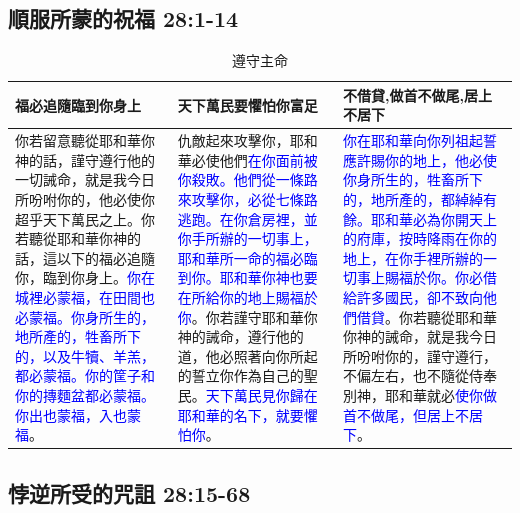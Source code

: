 \subsection{順服所蒙的祝福 28:1-14 }
\begin{table}[H]
\begin{center}

\begin{tabular}{ p{5.2cm}|p{5.4cm}|p{5.8cm} } \toprule
福必追隨臨到你身上&天下萬民要懼怕你富足&不借貸,做首不做尾,居上不居下\\\hline
你若留意聽從耶和華你神的話，謹守遵行他的一切誡命，就是我今日所吩咐你的，他必使你超乎天下萬民之上。你若聽從耶和華你神的話，這以下的福必追隨你，臨到你身上。\textcolor{blue}{你在城裡必蒙福，在田間也必蒙福。你身所生的，地所產的，牲畜所下的，以及牛犢、羊羔，都必蒙福。你的筐子和你的摶麵盆都必蒙福。你出也蒙福，入也蒙福}。
&仇敵起來攻擊你，耶和華必使他們\textcolor{blue}{在你面前被你殺敗。他們從一條路來攻擊你，必從七條路逃跑。在你倉房裡，並你手所辦的一切事上，耶和華所一命的福必臨到你。耶和華你神也要在所給你的地上賜福於你}。你若謹守耶和華你神的誡命，遵行他的道，他必照著向你所起的誓立你作為自己的聖民。\textcolor{blue}{天下萬民見你歸在耶和華的名下，就要懼怕你}。
&\textcolor{blue}{你在耶和華向你列祖起誓應許賜你的地上，他必使你身所生的，牲畜所下的，地所產的，都綽綽有餘。耶和華必為你開天上的府庫，按時降雨在你的地上，在你手裡所辦的一切事上賜福於你。你必借給許多國民，卻不致向他們借貸}。你若聽從耶和華你神的誡命，就是我今日所吩咐你的，謹守遵行，不偏左右，也不隨從侍奉別神，耶和華就必\textcolor{blue}{使你做首不做尾，但居上不居下}。\\\hline
\end{tabular}
\end{center}
\caption{遵守主命}
\end{table}


\subsection{悖逆所受的咒詛 28:15-68}

